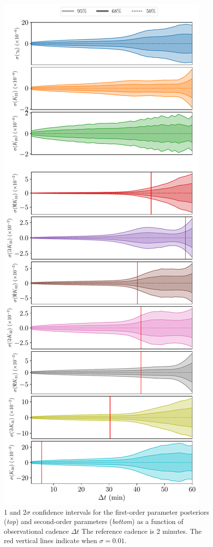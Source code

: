 \documentclass[fleqn,usenatbib]{mnras}
\begin{document}
\begin{figure}
  \centering
  \includegraphics[height=0.89\textheight]{figs/scan-cadence.pdf}
  \caption{1 and 2$\sigma$ confidence intervals for the first-order parameter posteriors (\textit{top}) and second-order parameters (\textit{bottom}) as a function of observational cadence $\Delta t$ The reference cadence is 2 minutes. The red vertical lines indicate when $\sigma = 0.01$.}
  \label{fig:scan-cadence}
\end{figure}
\end{document}
